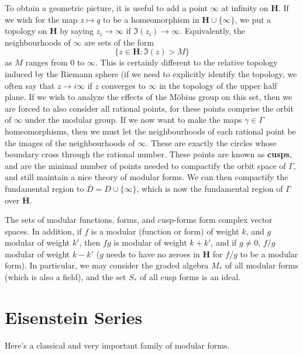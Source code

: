 To obtain a geometric picture, it is useful to add a point $\infty$ at infinity on $\mathbf{H}$. If we wish for the map $z \mapsto q$ to be a homeomorphism in $\mathbf{H} \cup \{ \infty \}$, we put a topology on $\mathbf{H}$ by saying $z_i \to \infty$ if $\Im(z_i) \to \infty$. Equivalently, the neighbourhoods of $\infty$ are sets of the form
%
\[ \{ z \in \mathbf{H} : \Im(z) > M \} \]
%
as $M$ ranges from $0$ to $\infty$. This is certainly different to the relative topology induced by the Riemann sphere (if we need to explicitly identify the topology, we often say that $z \to i \infty$ if $z$ converges to $\infty$ in the topology of the upper half plane. If we wish to analyze the effects of the M\"{o}bius group on this set, then we are forced to also consider all rational points, for these points comprise the orbit of $\infty$ under the modular group. If we now want to make the maps $\gamma \in \Gamma$ homeomorphisms, then we must let the neighbourhoods of each rational point be the images of the neighbourhoods of $\infty$. These are exactly the circles whose boundary cross through the rational number. These points are known as {\bf cusps}, and are the minimal number of points needed to compactify the orbit space of $\Gamma$, and still maintain a nice theory of modular forms. We can then compactify the fundamental region to $\overline{D} = D \cup \{ \infty \}$, which is now the fundamental region of $\Gamma$ over $\overline{\mathbf{H}}$.

The sets of modular functions, forms, and cusp-forms form complex vector spaces. In addition, if $f$ is a modular (function or form) of weight $k$, and $g$ modular of weight $k'$, then $fg$ is modular of weight $k + k'$, and if $g \neq 0$, $f/g$ modular of weight $k - k'$ ($g$ needs to have no zeroes in $\mathbf{H}$ for $f/g$ to be a modular form). In particular, we may consider the graded algebra $M_*$ of all modular forms (which is also a field), and the set $S_*$ of all cusp forms is an ideal.

\section{Eisenstein Series}

Here's a classical and very important family of modular forms.

